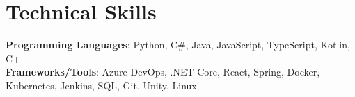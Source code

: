 \section{Technical Skills}
 \begin{itemize}[leftmargin=0.15in, label={}]
    \small{\item{
      \textbf{Programming Languages}{: Python, C\#, Java, JavaScript, TypeScript, Kotlin, C++ } \\
     \textbf{Frameworks/Tools}{: Azure DevOps, .NET Core, React, Spring, Docker, Kubernetes, Jenkins, SQL, Git, Unity, Linux }\\
    }}
 \end{itemize}